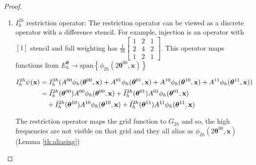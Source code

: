 \documentclass[12pt]{article}
\begin{document}
\begin{proof}
\begin{enumerate}
where $ \widehat{L}_h(\boldsymbol{\theta}) = \begin{bmatrix}
        \Tilde{L}_h(\boldsymbol{\theta}^{00}) & & &\\
        & \Tilde{L}_h(\boldsymbol{\theta}^{01}) & & \\
        & & \Tilde{L}_h(\boldsymbol{\theta}^{10}) & \\
        & & &\Tilde{L}_h(\boldsymbol{\theta}^{00})
    \end{bmatrix} $
    \item $I^{2h}_h$ restriction operator: The restriction operator can be viewed as a discrete operator with a difference stencil. For example, injection is an operator with $[1]$ stencil and full weighting has $\frac{1}{16} \begin{bmatrix}
    1 & 2 & 1\\
    2 & 4 & 2\\
    1 & 2 & 1
\end{bmatrix}$. This operator maps functions from $E^{\boldsymbol{\theta}}_h \to \text{span}\left\{\phi_{2h}(2\boldsymbol{\theta}^{00}, \mathbf{x})\right\}$

\begin{align*}
    I^{2h}_h \psi(\mathbf{x}) &= I^{2h}_h (A^{00} \phi_h(\boldsymbol{\theta}^{00}, \mathbf{x}) +  A^{01} \phi_h(\boldsymbol{\theta}^{01}, \mathbf{x}) + A^{10} \phi_h(\boldsymbol{\theta}^{10}, \mathbf{x}) + A^{11} \phi_h(\boldsymbol{\theta}^{11}, \mathbf{x})) \\
    &= \Tilde{I}_h^{2h}(\boldsymbol{\theta}^{00})A^{00} \phi_h(\boldsymbol{\theta}^{00}, \mathbf{x}) +  \Tilde{I}_h^{2h}(\boldsymbol{\theta}^{01})A^{01}\phi_h(\boldsymbol{\theta}^{01}, \mathbf{x}) \\
    &\quad+ \Tilde{I}_h^{2h}(\boldsymbol{\theta}^{10})A^{10}\phi_h(\boldsymbol{\theta}^{10}, \mathbf{x}) + \Tilde{I}_h^{2h}(\boldsymbol{\theta}^{11})A^{11}\phi_h(\boldsymbol{\theta}^{11}, \mathbf{x})
\end{align*}

The restriction operator maps the grid function to $G_{2h}$ and so, the high frequencies are not visible on that grid and they all alias as $\phi_{2h}(2\boldsymbol{\theta}^{00}, \mathbf{x})$ (Lemma \ref{th:aliasing})


\end{enumerate}
\end{proof}
\end{document}
